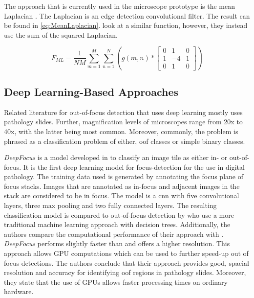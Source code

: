 The approach that is currently used in the microscope prototype is the mean Laplacian . The Laplacian is an edge detection convolutional filter. The result can be found in \autoref{eq:MeanLaplacian}. \textcite{redondo2012autofocus} look at a similar function, however, they instead use the sum of the squared Laplacian.

\begin{equation}
    \label{eq:MeanLaplacian}
    F_{ML}= \frac{1}{NM} \sum_{m=1}^{M}\sum_{n=1}^{N} (g(m,n) *
    \begin{bmatrix}
        0 & 1 & 0 \\
        1 & -4 & 1 \\
        0 & 1 & 0 
    \end{bmatrix}
    )
\end{equation}

\subsection{Deep Learning-Based Approaches}
\label{sec:Foundations:RelatedWorks:DeepLearning}

Related literature for out-of-focus detection that uses deep learning mostly uses pathology slides. Further, magnification levels of microscopes range from 20x to 40x, with the latter being most common. Moreover, commonly, the problem is phrased as a classification problem of either, \ac{oof} classes or simple binary classes.

\emph{DeepFocus} is a model developed in \textcite{senaras2018deepfocus} to classify an image tile as either in- or out-of-focus. It is the first deep learning model for focus-detection for the use in digital pathology. The training data used is generated by annotating the focus plane of focus stacks. Images that are annotated as in-focus and adjacent images in the stack are considered to be in focus. The model is a \ac{cnn} with five convolutional layers, three max pooling and two fully connected layers. The resulting classification model is compared to out-of-focus detection by \textcite{moleslopez2013automated} who use a more traditional machine learning approach with decision trees.
Additionally, the authors compare the computational performance of their approach with \textcite{moleslopez2013automated}. \emph{DeepFocus} performs slightly faster than \textcite{moleslopez2013automated} and offers a higher resolution. This approach allows GPU computations which can be used to further speed-up out of focus-detections.
The authors conclude that their approach provides good, spacial resolution and accuracy for identifying \ac{oof} regions in pathology slides. Moreover, they state that the use of GPUs allows faster processing times on ordinary hardware.

